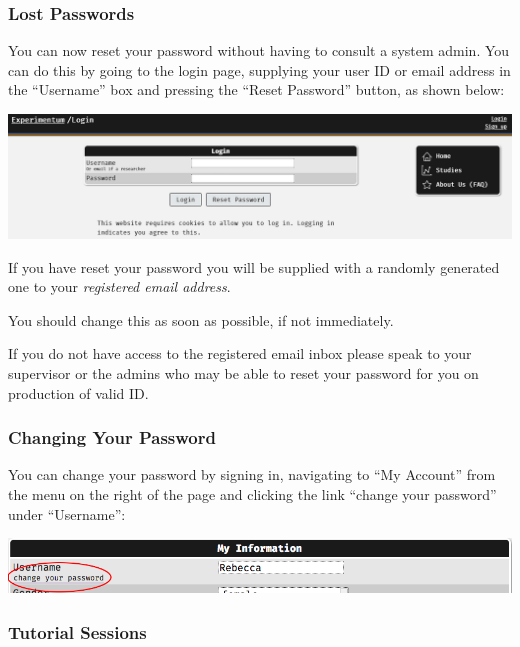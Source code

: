\documentclass[]{book}
\begin{document}
\hypertarget{lost_password}{\subsubsection*{Lost
Passwords}\label{lost_password}}

You can now reset your password without having to consult a system
admin. You can do this by going to the login page, supplying your user
ID or email address in the ``Username'' box and pressing the ``Reset
Password'' button, as shown below:

\includegraphics{images/screenshots/login.png}

\begin{warning}
If you have reset your password you will be supplied with a randomly
generated one to your \emph{registered email address}.

You should change this as soon as possible, if not immediately.
\end{warning}

If you do not have access to the registered email inbox please speak to
your supervisor or the admins who may be able to reset your password for
you on production of valid ID.

\subsubsection*{Changing Your Password}\label{changing-your-password}

You can change your password by signing in, navigating to ``My Account''
from the menu on the right of the page and clicking the link ``change
your password'' under ``Username'':

\includegraphics{images/screenshots/change_password.png}

\subsubsection*{Tutorial Sessions}\label{tutorial-sessions}
\end{document}
